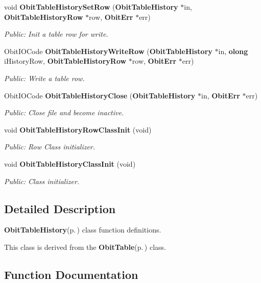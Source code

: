 \begin{CompactItemize}
void {\bf Obit\-Table\-History\-Set\-Row} ({\bf Obit\-Table\-History} $\ast$in, {\bf Obit\-Table\-History\-Row} $\ast$row, {\bf Obit\-Err} $\ast$err)
\begin{CompactList}\small\item\em Public: Init a table row for write. \item\end{CompactList}\item 
Obit\-IOCode {\bf Obit\-Table\-History\-Write\-Row} ({\bf Obit\-Table\-History} $\ast$in, {\bf olong} i\-History\-Row, {\bf Obit\-Table\-History\-Row} $\ast$row, {\bf Obit\-Err} $\ast$err)
\begin{CompactList}\small\item\em Public: Write a table row. \item\end{CompactList}\item 
Obit\-IOCode {\bf Obit\-Table\-History\-Close} ({\bf Obit\-Table\-History} $\ast$in, {\bf Obit\-Err} $\ast$err)
\begin{CompactList}\small\item\em Public: Close file and become inactive. \item\end{CompactList}\item 
void {\bf Obit\-Table\-History\-Row\-Class\-Init} (void)
\begin{CompactList}\small\item\em Public: Row Class initializer. \item\end{CompactList}\item 
void {\bf Obit\-Table\-History\-Class\-Init} (void)
\begin{CompactList}\small\item\em Public: Class initializer. \item\end{CompactList}\end{CompactItemize}


\subsection{Detailed Description}
{\bf Obit\-Table\-History}{\rm (p.\,\pageref{structObitTableHistory})} class function definitions. 

This class is derived from the {\bf Obit\-Table}{\rm (p.\,\pageref{structObitTable})} class.

\subsection{Function Documentation}
